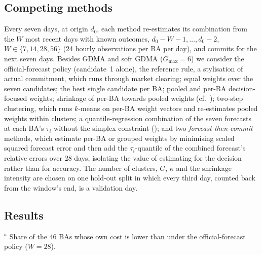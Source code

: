 \subsection{Competing methods}

Every seven days, at origin $d_0$, each method re-estimates its combination from the $W$ most recent days with known outcomes, $d_0-W-1,\dots,d_0-2$, $W\in\{7,14,28,56\}$ (24 hourly observations per BA per day), and commits for the next seven days.
Besides GDMA and soft GDMA ($G_{\max}=6$) we consider
the official-forecast policy (candidate~1 alone), the reference rule, a stylisation of actual commitment, which runs through market clearing;
equal weights over the seven candidates;
the best single candidate per BA;
pooled and per-BA decision-focused weights;
shrinkage of per-BA towards pooled weights (cf.\ \citealp{DieboldShin2019});
two-step clustering, which runs $k$-means on per-BA weight vectors and re-estimates pooled weights within clusters;
a quantile-regression combination of the seven forecasts at each BA's $\tau_i$ without the simplex constraint (\citealp{Wang2019cqra});
and two \emph{forecast-then-commit} methods, which estimate per-BA or grouped weights by minimising scaled squared forecast error and then add the $\tau_i$-quantile of the combined forecast's relative errors over 28 days, isolating the value of estimating for the decision rather than for accuracy.
The number of clusters, $G$, $\kappa$ and the shrinkage intensity are chosen on one hold-out split in which every third day, counted back from the window's end, is a validation day.

\subsection{Results}

\begin{table}[t]
\centering
\caption{Out-of-sample system-wide commitment cost, 1 May 2020 to 26 September 2026, relative to committing on the official day-ahead forecasts. $W$ is the estimation window length. Bold: lowest cost in the column. Stars: Diebold--Mariano test of equal daily system cost against soft GDMA with Newey--West variance (7 lags); $^{*}$, $^{**}$, $^{***}$: $p<0.10,0.05,0.01$. Lower is better: values below 1 mean a lower cost than the benchmark.}\label{tab:main}
\footnotesize

\par\smallskip\footnotesize $^a$ Share of the 46 BAs whose own cost is lower than under the official-forecast policy ($W=28$).
\end{table}

